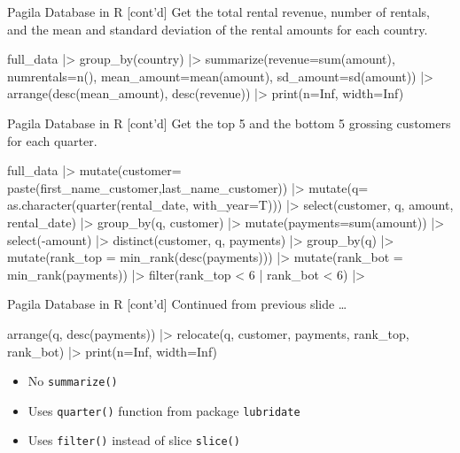 \documentclass[ignorenonframetext,xcolor=x11names]{beamer}
\begin{document}
\begin{frame}[fragile]{Pagila Database in R \small [cont'd]}
Get the total rental revenue, number of rentals, and the mean and standard deviation of the rental amounts for each country.

\footnotesize
\begin{Rcode}
full_data |>
  group_by(country) |>
  summarize(revenue=sum(amount), 
            numrentals=n(),
            mean_amount=mean(amount),
            sd_amount=sd(amount)) |>
  arrange(desc(mean_amount),
          desc(revenue)) |>
  print(n=Inf, width=Inf)  
\end{Rcode}
\normalsize
\end{frame}

\begin{frame}[fragile]{Pagila Database in R \small [cont'd]}
Get the top 5 and the bottom 5 grossing customers for each quarter.

\footnotesize
\begin{Rcode}
full_data |>
  mutate(customer=
   paste(first_name_customer,last_name_customer)) |>
  mutate(q=
   as.character(quarter(rental_date, with_year=T))) |>
  select(customer, q, amount, rental_date) |>
  group_by(q, customer) |>
  mutate(payments=sum(amount)) |>
  select(-amount) |>
  distinct(customer, q, payments) |>
  group_by(q) |>
  mutate(rank_top = min_rank(desc(payments))) |>
  mutate(rank_bot = min_rank(payments)) |>
  filter(rank_top < 6 | rank_bot < 6) |>
\end{Rcode}
\end{frame}

\begin{frame}[fragile]{Pagila Database in R \small [cont'd]}
Continued from previous slide \ldots

\footnotesize
\begin{Rcode}
  arrange(q, desc(payments)) |>
  relocate(q, customer, payments, 
              rank_top, rank_bot) |>
  print(n=Inf, width=Inf)
\end{Rcode}
\normalsize
\begin{itemize}
  \item No \texttt{summarize()}
  \item Uses \texttt{quarter()} function from package \texttt{lubridate}
  \item Uses \texttt{filter()} instead of slice \texttt{slice()}
\end{itemize}
\end{frame}
\end{document}
